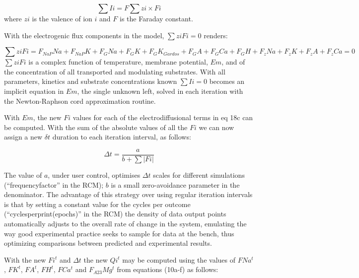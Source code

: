 \documentclass[a4paper]{article}
\newcommand{\F}[2]{F_{#1}#2}
\begin{document}
\begin{equation}
\sum Ii = F\sum zi\times Fi 
\end{equation}
where $zi$ is the valence of ion $i$ and $F$ is the Faraday constant. 

With the electrogenic flux components in the model, $\sum ziFi = 0$ renders:

\begin{equation}
\sum ziFi = \F{NaP}{Na} + \F{NaP}{K} + \F{G}{Na} + \F{G}{K} + \F{G}{K_{Gardos}} + \F{G}{A} + \F{G}{Ca} + \F{G}{H} + \F{z}{Na} + \F{z}{K} + \F{z}{A} + \F{z}{Ca} = 0
\end{equation}
$\sum ziFi$ is a complex function of temperature, membrane potential, $Em$, and of the concentration of all transported and modulating substrates.  With all parameters, kinetics and substrate concentrations known $\sum Ii = 0$ becomes an implicit equation in $Em$, the single unknown left, solved in each iteration with the Newton-Raphson cord approximation routine.      

With $Em$, the new $Fi$ values for each of the electrodiffusional terms in eq 18c can be computed.  With the sum of the absolute values of all the $Fi$ we can now assign a new $\delta t$ duration to each iteration interval, as follows:  

\setcounter{equation}{18}
\renewcommand{\theequation}{\arabic{equation}}
\begin{equation}
\Delta t = \frac{a}{b + \sum|Fi|}
\end{equation}

The value of $a$, under user control, optimises $\Delta t$ scales for different simulations (“frequencyfactor” in the RCM); $b$ is a small zero-avoidance parameter in the denominator. The advantage of this strategy over using regular iteration intervals is that by setting a constant value for the cycles per outcome (“cyclesperprint(epochs)” in the RCM) the density of data output points automatically adjusts to the overall rate of change in the system, emulating the way good experimental practice seeks to sample for data at the bench, thus optimizing comparisons between predicted and experimental results.    

With the new $Fi^t$ and $\Delta t$ the new $Qi^t$ may be computed using the values of $FNa^t$, $FK^t$, $FA^t$, $FH^t$, $FCa^t$ and $\F{A23}{Mg}^t$ from equations (10a-f) as follows:

\setcounter{equation}{0}
\renewcommand{\theequation}{20\alph{equation}}
\end{document}

